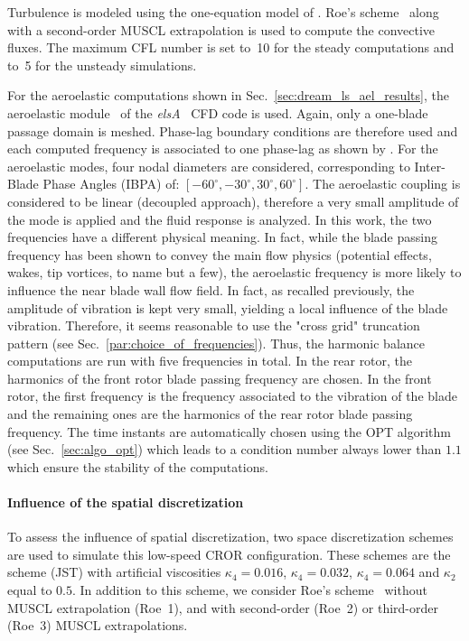 Turbulence is modeled using the one-equation model of
\citet{Spalart1992}.  Roe's scheme~\cite{Roe1981} along with a 
second-order MUSCL extrapolation 
is used to compute the convective fluxes.
The maximum CFL number is set to~10 for the steady 
computations and to~5 for the unsteady simulations.

For the aeroelastic computations shown in
Sec.~\ref{sec:dream_ls_ael_results}, 
the aeroelastic module~\cite{CIDugeai2011} 
of the \textit{elsA}~\cite{Cambier2013} CFD code is used.
Again, only a one-blade passage domain is meshed.
Phase-lag boundary conditions are therefore used
and each computed frequency is associated to one phase-lag
as shown by \citet{ThesisGuedeney}.
For the aeroelastic modes, 
four nodal diameters are considered, corresponding to Inter-Blade
Phase Angles (IBPA) of: $[-60^\circ, -30^\circ, 30^\circ, 60^\circ]$. 
The aeroelastic coupling is considered to be linear (decoupled
approach), therefore a very small amplitude of the mode is applied
and the fluid response is analyzed.
In this work, the two frequencies 
have a different physical meaning. In fact, while the blade passing frequency
has been shown to convey the main flow physics (potential effects, wakes, 
tip vortices, to name but a few), the aeroelastic frequency is more likely
to influence the near blade wall flow field. In fact, as recalled
previously, the amplitude of vibration is kept very small,
yielding a local influence of the blade vibration.
Therefore, it seems reasonable to use the "cross grid"
truncation pattern (see Sec.~\ref{par:choice_of_frequencies}).
Thus, the harmonic balance computations are run with
five frequencies in total. In the rear rotor,
the harmonics of the front rotor blade passing frequency
are chosen. In the front rotor, the first frequency is the
frequency associated to the vibration of the blade and the
remaining ones are the harmonics of the rear rotor blade 
passing frequency.
The time instants are automatically chosen using the OPT
algorithm (see Sec.~\ref{sec:algo_opt}) which leads to 
a condition number always lower than $1.1$ which ensure
the stability of the computations.

\paragraph{Influence of the spatial discretization}
\label{sub:dream_ls_spatial_discretization}

To assess the influence of spatial discretization, two 
space discretization schemes are used to simulate this low-speed CROR configuration.
These schemes are the \citet{Jameson1981} scheme (JST) with artificial
viscosities $\kappa_4 = 0.016$, $\kappa_4 = 0.032$, $\kappa_4 = 0.064$
and $\kappa_2$ equal to $0.5$. In addition to this scheme, we consider
Roe's scheme~\cite{Roe1981} without MUSCL extrapolation (Roe~1),
and with second-order (Roe~2) or third-order (Roe~3) 
MUSCL extrapolations.

